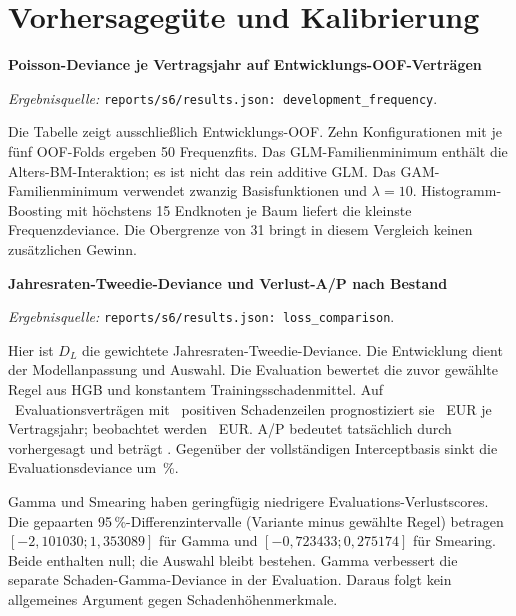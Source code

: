 \documentclass[11pt,a4paper]{article}
\newcommand{\evidence}[1]{\par{\footnotesize\textit{Ergebnisquelle:} \nolinkurl{#1}.}\par}
\begin{document}
\clearpage
\section{Vorhersagegüte und Kalibrierung}
\noindent\textbf{Poisson-Deviance je Vertragsjahr auf Entwicklungs-OOF-Verträgen}
\begin{center}\small\FrequencyTable\end{center}
\evidence{reports/s6/results.json: development_frequency}
Die Tabelle zeigt ausschließlich Entwicklungs-OOF. Zehn Konfigurationen mit je fünf OOF-Folds ergeben 50 Frequenzfits. Das GLM-Familienminimum enthält die Alters-BM-Interaktion; es ist nicht das rein additive GLM. Das GAM-Familienminimum verwendet zwanzig Basisfunktionen und $\lambda=10$. Histogramm-Boosting mit höchstens 15 Endknoten je Baum liefert die kleinste Frequenzdeviance. Die Obergrenze von 31 bringt in diesem Vergleich keinen zusätzlichen Gewinn.

\noindent\textbf{Jahresraten-Tweedie-Deviance und Verlust-A/P nach Bestand}
\begin{center}\small\LossTable\end{center}
\evidence{reports/s6/results.json: loss_comparison}
Hier ist $D_L$ die gewichtete Jahresraten-Tweedie-Deviance. Die Entwicklung dient der Modellanpassung und Auswahl. Die Evaluation bewertet die zuvor gewählte Regel aus HGB und konstantem Trainingsschadenmittel. Auf \EvalPolicies\ Evaluationsverträgen mit \EvalClaims\ positiven Schadenzeilen prognostiziert sie \EvalPredicted\ EUR je Vertragsjahr; beobachtet werden \EvalObserved\ EUR. A/P bedeutet tatsächlich durch vorhergesagt und beträgt \EvalAP. Gegenüber der vollständigen Interceptbasis sinkt die Evaluationsdeviance um \EvalGain\,\%.

Gamma und Smearing haben geringfügig niedrigere Evaluations-Verlustscores. Die gepaarten 95\,\%-Differenzintervalle (Variante minus gewählte Regel) betragen $[-2{,}101030;1{,}353089]$ für Gamma und $[-0{,}723433;0{,}275174]$ für Smearing. Beide enthalten null; die Auswahl bleibt bestehen. Gamma verbessert die separate Schaden-Gamma-Deviance in der Evaluation. Daraus folgt kein allgemeines Argument gegen Schadenhöhenmerkmale.
\end{document}
